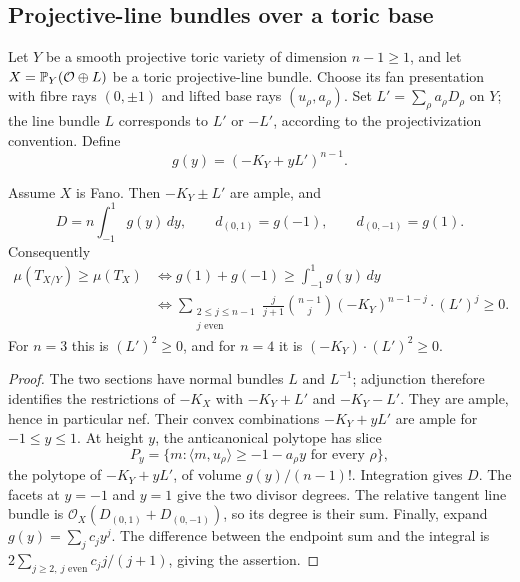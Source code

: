 \subsection{Projective-line bundles over a toric base}

Let $Y$ be a smooth projective toric variety of dimension $n-1\ge1$, and
let $X=\mathbb{P}_Y(\mathcal O\oplus L)$ be a toric projective-line bundle.
Choose its fan presentation with fibre rays $(0,\pm1)$ and lifted
base rays $(u_\rho,a_\rho)$. Set $L'=\sum_\rho a_\rho D_\rho$ on $Y$;
the line bundle $L$ corresponds to $L'$ or $-L'$, according to the
projectivization convention. Define
\[
 g(y)=(-K_Y+yL')^{n-1}.
\]

\begin{proposition}\label{aux:p1bundle}
Assume $X$ is Fano. Then $-K_Y\pm L'$ are ample, and
\[
 D=n\int_{-1}^1g(y)\,dy,\qquad
 d_{(0,1)}=g(-1),\qquad d_{(0,-1)}=g(1).
\]
Consequently
\begin{align*}
 \mu(T_{X/Y})\ge\mu(T_X)
 &\Longleftrightarrow
 g(1)+g(-1)\ge\int_{-1}^1g(y)\,dy\\
 &\Longleftrightarrow
 \sum_{\substack{2\le j\le n-1\\ j\text{ even}}}
 \frac{j}{j+1}\binom{n-1}{j}(-K_Y)^{n-1-j}\cdot(L')^j\ge0.
\end{align*}
For $n=3$ this is $(L')^2\ge0$, and for $n=4$ it is
$(-K_Y)\cdot(L')^2\ge0$.
\end{proposition}

\begin{proof}
The two sections have normal bundles $L$ and $L^{-1}$; adjunction
therefore identifies the restrictions of $-K_X$ with $-K_Y+L'$ and
$-K_Y-L'$. They are ample, hence in particular nef. Their convex
combinations $-K_Y+yL'$ are ample for $-1\le y\le1$.
At height $y$, the anticanonical polytope has slice
\[
 P_y=\{m:\langle m,u_\rho\rangle\ge-1-a_\rho y
                         \text{ for every }\rho\},
\]
the polytope of $-K_Y+yL'$, of volume $g(y)/(n-1)!$.
Integration gives $D$. The facets at $y=-1$ and $y=1$ give the
two divisor degrees. The relative tangent line bundle is
$\mathcal O_X(D_{(0,1)}+D_{(0,-1)})$, so its degree is their sum.
Finally, expand $g(y)=\sum_j c_jy^j$. The difference between the
endpoint sum and the integral is
$2\sum_{j\ge2,\ j\text{ even}}c_jj/(j+1)$, giving the assertion.
\end{proof}

